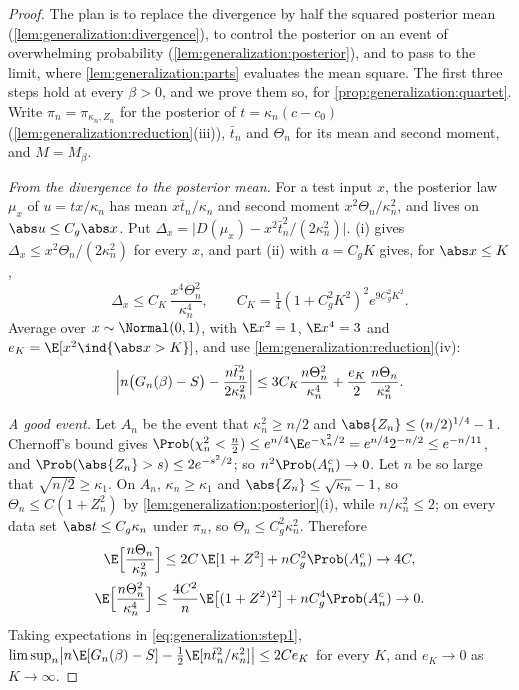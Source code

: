 \begin{refsection}
\begin{proof}
The plan is to replace the divergence by half the squared posterior mean (\cref{lem:generalization:divergence}), to control the posterior on an event of overwhelming probability (\cref{lem:generalization:posterior}), and to pass to the limit, where \cref{lem:generalization:parts} evaluates the mean square. The first three steps hold at every $\beta>0$, and we prove them so, for \cref{prop:generalization:quartet}. Write $\pi_n=\pi_{\kappa_n,Z_n}$ for the posterior of $t=\kappa_n(c-c_0)$ (\cref{lem:generalization:reduction}(iii)), $\bar t_n$ and $\Theta_n$ for its mean and second moment, and $M=M_\beta$.

\emph{From the divergence to the posterior mean.} For a test input $x$, the posterior law $\mu_x$ of $u=tx/\kappa_n$ has mean $x\bar t_n/\kappa_n$ and second moment $x^2\Theta_n/\kappa_n^2$, and lives on $\abs u\le C_g\abs x$. Put $\Delta_x=\bigl\lvert D(\mu_x)-x^2\bar t_n^2/(2\kappa_n^2)\bigr\rvert$. (i) gives $\Delta_x\le x^2\Theta_n/(2\kappa_n^2)$ for every $x$, and part (ii) with $a=C_gK$ gives, for $\abs x\le K$,
\[
\Delta_x\le C_K\,\frac{x^4\Theta_n^2}{\kappa_n^4},\qquad C_K=\tfrac14(1+C_g^2K^2)^2e^{9C_g^2K^2}.
\]
Average over $x\sim\Normal(0,1)$, with $\E x^2=1$, $\E x^4=3$ and $e_K=\E[x^2\ind\{\abs x>K\}]$, and use \cref{lem:generalization:reduction}(iv):
\begin{equation}\label{eq:generalization:step1}
\Bigl\lvert n\bigl(G_n(\beta)-S\bigr)-\frac{n\bar t_n^2}{2\kappa_n^2}\Bigr\rvert\le3C_K\frac{n\Theta_n^2}{\kappa_n^4}+\frac{e_K}2\,\frac{n\Theta_n}{\kappa_n^2}.
\end{equation}

\emph{A good event.} Let $A_n$ be the event that $\kappa_n^2\ge n/2$ and $\abs{Z_n}\le(n/2)^{1/4}-1$. Chernoff's bound gives $\Prob(\chi^2_n<\frac n2)\le e^{n/4}\E e^{-\chi^2_n/2}=e^{n/4}2^{-n/2}\le e^{-n/11}$, and $\Prob(\abs{Z_n}>s)\le2e^{-s^2/2}$; so $n^2\Prob(A_n^c)\to0$. Let $n$ be so large that $\sqrt{n/2}\ge\kappa_1$. On $A_n$, $\kappa_n\ge\kappa_1$ and $\abs{Z_n}\le\sqrt{\kappa_n}-1$, so $\Theta_n\le C(1+Z_n^2)$ by \cref{lem:generalization:posterior}(i), while $n/\kappa_n^2\le2$; on every data set $\abs t\le C_g\kappa_n$ under $\pi_n$, so $\Theta_n\le C_g^2\kappa_n^2$. Therefore
\begin{gather*}
\E\Bigl[\frac{n\Theta_n}{\kappa_n^2}\Bigr]\le2C\,\E[1+Z^2]+nC_g^2\Prob(A_n^c)\to4C,\\
\E\Bigl[\frac{n\Theta_n^2}{\kappa_n^4}\Bigr]\le\frac{4C^2}n\E\bigl[(1+Z^2)^2\bigr]+nC_g^4\Prob(A_n^c)\to0 .
\end{gather*}
Taking expectations in \eqref{eq:generalization:step1}, $\limsup_n\bigl\lvert n\E[G_n(\beta)-S]-\frac12\E[n\bar t_n^2/\kappa_n^2]\bigr\rvert\le2Ce_K$ for every $K$, and $e_K\to0$ as $K\to\infty$.


\end{proof}
\end{refsection}
